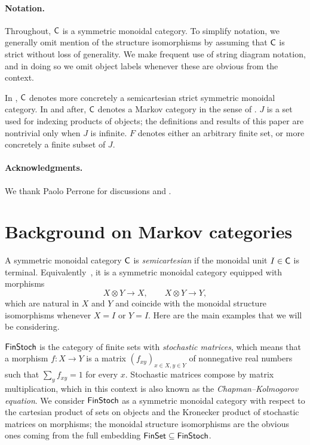 \documentclass[11pt]{article}
\begin{document}
\paragraph*{Notation.} 

Throughout, $\mathsf{C}$ is a symmetric monoidal category. To simplify notation, we generally omit mention of the structure isomorphisms by assuming that $\mathsf{C}$ is strict without loss of generality. We make frequent use of string diagram notation, and in doing so we omit object labels whenever these are obvious from the context.

In , $\mathsf{C}$ denotes more concretely a semicartesian strict symmetric monoidal category. In  and after, $\mathsf{C}$ denotes a Markov category in the sense of . $J$ is a set used for indexing products of objects; the definitions and results of this paper are nontrivial only when $J$ is infinite. $F$ denotes either an arbitrary finite set, or more concretely a finite subset of $J$.

\paragraph*{Acknowledgments.} We thank Paolo Perrone for discussions and .

\section{Background on Markov categories}\label{background}

A symmetric monoidal category $\mathsf{C}$ is \emph{semicartesian} if the monoidal unit $I \in \mathsf{C}$ is terminal. Equivalently~\cite[Theorem~3.5]{GLS}, it is a symmetric monoidal category equipped with morphisms
\begin{equation}
	\label{projections}
	X \otimes Y \longrightarrow X, \qquad X \otimes Y \longrightarrow Y,
\end{equation}
which are natural in $X$ and $Y$ and coincide with the monoidal structure isomorphisms whenever $X = I$ or $Y = I$. Here are the main examples that we will be considering.

\begin{example}
	\label{finstoch}
	$\operatorname{\mathsf{FinStoch}}$ is the category of finite sets with \emph{stochastic matrices}, which means that a morphism $f : X \to Y$ is a matrix $(f_{xy})_{x \in X,y \in Y}$ of nonnegative real numbers such that $\sum_y f_{xy} = 1$ for every $x$. Stochastic matrices compose by matrix multiplication, which in this context is also known as the \emph{Chapman--Kolmogorov equation}. We consider $\operatorname{\mathsf{FinStoch}}$ as a symmetric monoidal category with respect to the cartesian product of sets on objects and the Kronecker product of stochastic matrices on morphisms; the monoidal structure isomorphisms are the obvious ones coming from the full embedding $\operatorname{\mathsf{FinSet}} \subseteq \operatorname{\mathsf{FinStoch}}$.
\end{example}
\end{document}

